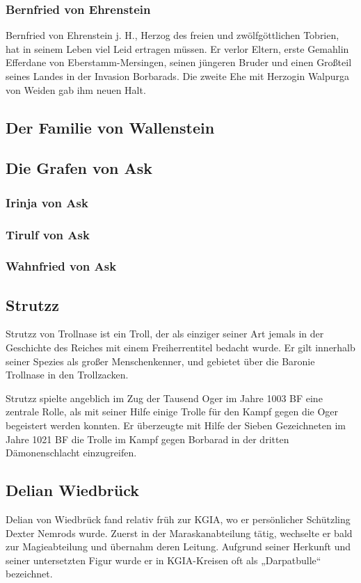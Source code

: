\subsubsection{Bernfried von Ehrenstein}
Bernfried von Ehrenstein j. H., Herzog des freien und zwölfgöttlichen Tobrien, hat in seinem Leben viel Leid ertragen müssen. Er verlor Eltern, erste Gemahlin Efferdane von Eberstamm-Mersingen, seinen jüngeren Bruder und einen Großteil seines Landes in der Invasion Borbarads. Die zweite Ehe mit Herzogin Walpurga von Weiden gab ihm neuen Halt. 

\subsection{Der Familie von Wallenstein}

\subsection{Die Grafen von Ask}
\subsubsection{Irinja von Ask}
\subsubsection{Tirulf von Ask}
\subsubsection{Wahnfried von Ask}

\subsection{Strutzz}
Strutzz von Trollnase ist ein Troll, der als einziger seiner Art jemals in der Geschichte des Reiches mit einem Freiherrentitel bedacht wurde. Er gilt innerhalb seiner Spezies als großer Menschenkenner, und gebietet über die Baronie Trollnase in den Trollzacken.

Strutzz spielte angeblich im Zug der Tausend Oger im Jahre 1003 BF eine zentrale Rolle, als mit seiner Hilfe einige Trolle für den Kampf gegen die Oger begeistert werden konnten. Er überzeugte mit Hilfe der Sieben Gezeichneten im Jahre 1021 BF die Trolle im Kampf gegen Borbarad in der dritten Dämonenschlacht einzugreifen. 

\subsection{Delian Wiedbrück}
Delian von Wiedbrück fand relativ früh zur KGIA, wo er persönlicher Schützling Dexter Nemrods wurde. Zuerst in der Maraskanabteilung tätig, wechselte er bald zur Magieabteilung und übernahm deren Leitung. Aufgrund seiner Herkunft und seiner untersetzten Figur wurde er in KGIA-Kreisen oft als „Darpatbulle“ bezeichnet. 

